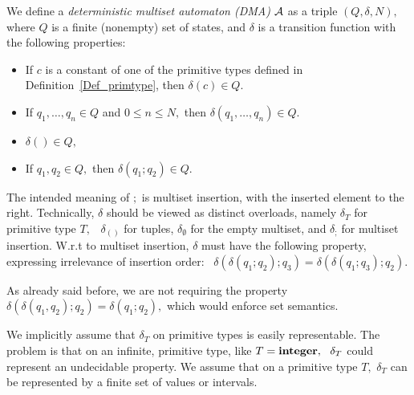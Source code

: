 \begin{definition}
   \label{Def_DMA}
   We define a \emph{deterministic multiset automaton (DMA)}
   $ {\cal A} $ as a triple
   $ ( Q, \delta, N ), $ where $ Q $ is a finite (nonempty) set of states,
   and $ \delta $ is a transition function with the following
   properties:
   \begin{itemize}
   \item
      If $ c $ is a constant of one of the primitive types
      defined in Definition~\ref{Def_primtype}, then
      $ \delta(c) \in Q. $
   \item
      If $ q_1, \ldots, q_n \in Q $ and $ 0 \leq n \leq N, $
      then
      $ \delta( q_1, \ldots, q_n ) \in Q. $
   \item
      $ \delta( ) \in Q, $
   \item
      If $ q_1,q_2 \in Q, $ then
      $ \delta( q_1; q_2 ) \in Q. $
   \end{itemize}
   The intended meaning of $ ; $ is multiset insertion, with
   the inserted element to the right.
   Technically, $ \delta $ should be viewed as distinct overloads,
   namely
   $ \delta_T $ for primitive type $ T, $ \
   $ \delta_{()} $ for tuples,
   $ \delta_{\emptyset} $ for the empty multiset, and $ \delta_{;} $
   for multiset insertion.
   W.r.t to multiset insertion,
   $ \delta $ must have the following property,
   expressing irrelevance of insertion order: \ 
   $ 
       \delta( \delta( q_1; q_2 ); q_3 ) =
       \delta( \delta( q_1; q_3 ); q_2 ).
   $ 
\end{definition}
As already said before, we are not requiring the property
$ \delta( \delta( q_1, q_2 ); q_2 ) = \delta( q_1; q_2 ), $ which
would enforce set semantics. 

We implicitly assume that $ \delta_T $ on primitive types is
easily representable. The problem is that on an infinite, primitive type,
like $ T = {\bf integer}, \ \ \delta_T $ could represent an 
undecidable property. We assume that on a primitive type $ T, $ 
$ \delta_T $ can be represented by a finite set of values or intervals.

